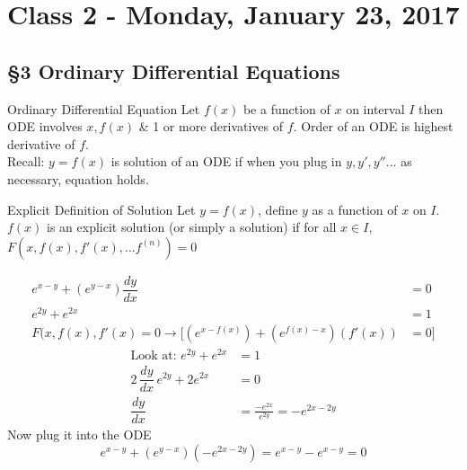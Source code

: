 \chapter{Class 2 - Monday, January 23, 2017}
\section{\S 3 Ordinary Differential Equations}
\begin{imp:defn}{Ordinary Differential Equation}{} Let $f(x)$ be a function of $x$ on interval $I$ then ODE involves $x,f(x)$ \& 1 or more derivatives of $f$. Order of an ODE is highest derivative of $f$.\\
Recall: $y=f(x)$ is solution of an ODE if when you plug in $y, y', y''...$ as necessary, equation holds.
\end{imp:defn}
\begin{imp:defn}{Explicit Definition of Solution}{} Let $y=f(x)$, define $y$ as a function of $x$ on $I$. $f(x)$ is an explicit solution (or simply a solution) if for all $x\in I$, $F(x, f(x), f'(x),...f^{(n)})=0$
\end{imp:defn}
\begin{ex}
\begin{align*}
    e^{x-y}+(e^{y-x})\dfrac{dy}{dx} & =0\\
    e^{2y}+e^{2x} & =1\\
    F(x, f(x), f'(x)=0 \rightarrow [(e^{x-f(x)})+(e^{f(x)-x})(f'(x)) & = 0]
\end{align*}
\begin{align*}
    \text{Look at: }e^{2y}+e^{2x} & = 1\\
    2\,\dfrac{dy}{dx}\, e^{2y}+2e^{2x} & = 0\\
    \dfrac{dy}{dx} & = \frac{-e^{2x}}{e^{2y}} = -e^{2x-2y}
\end{align*}
Now plug it into the ODE $$e^{x-y}+(e^{y-x})(-e^{2x-2y})=e^{x-y}-e^{x-y}=0$$
\end{ex}
